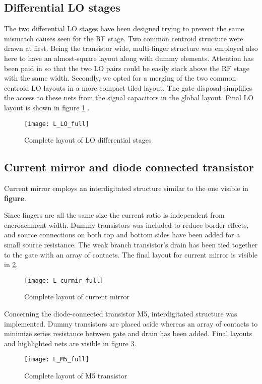 \newpage
\subsection{Differential LO stages}
The two differential LO stages have been designed trying to prevent the same mismatch causes seen for the RF stage. Two common centroid structure were drawn at first. Being the transistor wide, multi-finger structure was employed also here to have an almost-square layout along with dummy elements. Attention has been paid in so that the two LO pairs could be easily stack above the RF stage with the same width. 
Secondly, we opted for a merging of the two common centroid LO layouts in a more compact tiled layout. The gate disposal simplifies the access to these nets from the signal capacitors in the global layout. Final LO layout is shown in figure \ref{L_LO_full} .

\begin{figure}[H]
	\centering
	\texttt{[image: L\_LO\_full]}
	\caption{Complete layout of LO differential stages}
	\label{L_LO_full}
\end{figure}

\subsection{Current mirror and diode connected transistor}
Current mirror employs an interdigitated structure similar to the one visible in \textbf{figure}.

Since fingers are all the same size the current ratio is independent from encroachment width. Dummy transistors was included to reduce border effects, and source connections on both top and bottom sides have been added for a small source resistance. The weak branch transistor's drain has been tied together to the gate with an array of contacts. The final layout for current mirror is visible in \ref{L_curmir_full}.

\begin{figure}[H]
	\centering
	\texttt{[image: L\_curmir\_full]}
	\caption{Complete layout of current mirror}
	\label{L_curmir_full}
\end{figure}

Concerning the diode-connected transistor M5, interdigitated structure was implemented. Dummy transistors are placed aside whereas an array of contacts to minimize series resistance between gate and drain has been added. Final layouts and highlighted nets are visible in figure \ref{L_M5_full}. 
\begin{figure}[H]
	\centering
	\texttt{[image: L\_M5\_full]}
	\caption{Complete layout of M5 transistor}
	\label{L_M5_full}
\end{figure}

